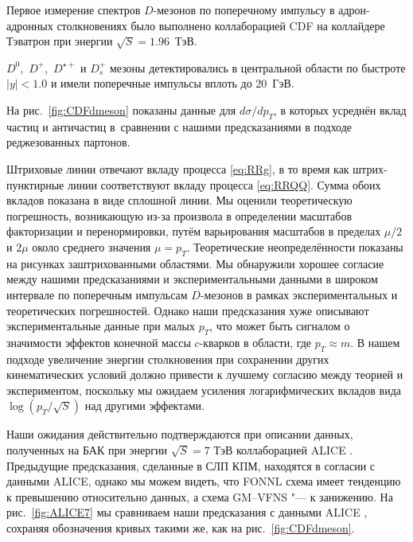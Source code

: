%




Первое измерение спектров $D$-мезонов по поперечному импульсу в адрон-адронных столкновениях было выполнено коллаборацией CDF на коллайдере Тэватрон \cite{CDFdmeson} при энергии $\sqrt S=1.96$~ТэВ. 

$D^0$,~$D^+$,~$D^{\star+}$ и $D_s^+$ мезоны детектировались в центральной области по быстроте $|y|<1.0$ и имели поперечные импульсы вплоть до 20~ГэВ. 

На рис.~\ref{fig:CDFdmeson} показаны данные для $d\sigma/dp_T$, в которых усреднён вклад частиц и античастиц в~сравнении с нашими предсказаниями в подходе реджезованных партонов. 

Штриховые линии отвечают вкладу процесса \eqref{eq:RRg}, в то время как штрих-пунктирные линии соответствуют вкладу процесса \eqref{eq:RRQQ}. Сумма обоих вкладов показана в виде сплошной линии. Мы оценили теоретическую погрешность, возникающую из-за произвола в определении масштабов факторизации и перенормировки, путём варьирования масштабов в пределах $\mu/2$ и $2 \mu$ около среднего значения $\mu=p_T$. Теоретические неопределённости показаны на рисунках заштрихованными областями. Мы обнаружили хорошее согласие между нашими предсказаниями и экспериментальными данными в широком интервале по поперечным импульсам $D$-мезонов в рамках экспериментальных и теоретических погрешностей. Однако наши предсказания хуже описывают экспериментальные данные при малых $p_T$, что может быть сигналом о значимости эффектов конечной массы $c$-кварков в области, где $p_T\approx m$. В нашем подходе увеличение энергии столкновения при сохранении других кинематических условий должно привести к лучшему согласию между теорией и экспериментом, поскольку мы ожидаем усиления логарифмических вкладов вида $\log(p_{T}/\sqrt{S})$ над другими эффектами.



Наши ожидания действительно подтверждаются при описании данных, полученных на БАК при энергии $\sqrt S=7$ ТэВ коллаборацией  ALICE \cite{ALICE7}. Предыдущие предсказания, сделанные в СЛП КПМ, находятся в согласии с данными ALICE, однако мы можем видеть, что FONNL схема \cite{newNLO} имеет тенденцию к превышению относительно данных, а схема GM--VFNS \cite{KKSS2012} "--- к занижению. На рис.~\ref{fig:ALICE7} мы сравниваем наши предсказания с данными ALICE \cite{ALICE7}, сохраняя обозначения кривых такими же, как на рис.~\ref{fig:CDFdmeson}. 

